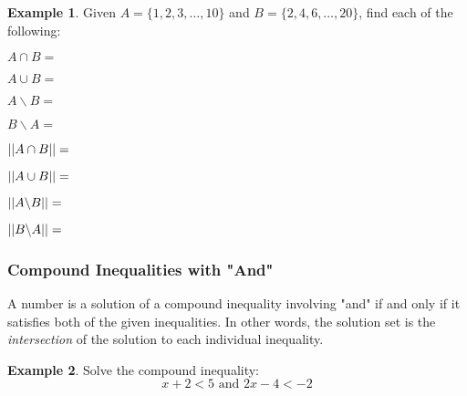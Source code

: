 \documentclass[addpoints,12pt]{exam}
\theoremstyle{definition}
\newtheorem{example}{Example}[subsection]
\begin{document}
\newpage
\begin{example}
Given $A = \{1,2,3,\dots,10\}$ and $B = \{2,4,6,\dots,20\}$, find each of the following:
\begin{enumerate}
\begin{minipage}{.5\textwidth}

\item $A \cap B = $
\vspace{.35in}
\item $A \cup B = $
\vspace{.35in}
\item $A\backslash B = $
\vspace{.35in}
\item $B\backslash A = $
\vspace{.35in}
\end{minipage}%
\begin{minipage}{.5\textwidth}
\item $\abs{\abs{A \cap B}} = $
\vspace{.35in}
\item $\abs{\abs{A \cup B }}= $
\vspace{.35in}
\item $\abs{\abs{A\backslash B}} = $
\vspace{.35in}
\item $\abs{\abs{B\backslash A}} = $
\vspace{.35in}

\end{minipage}%
\end{enumerate}
\end{example}

\vspace{.2in}

\subsubsection*{Compound Inequalities with "And"}

A number is a solution of a compound inequality involving "and" if and only if it satisfies both of the given inequalities. In other words, the solution set is the \emph{intersection} of the solution to each individual inequality.

\begin{example}
Solve the compound inequality:
\[x + 2 < 5 \text{ and } 2x-4 <-2\]
\vspace{2in}
\end{example}

\newpage
\end{document}
